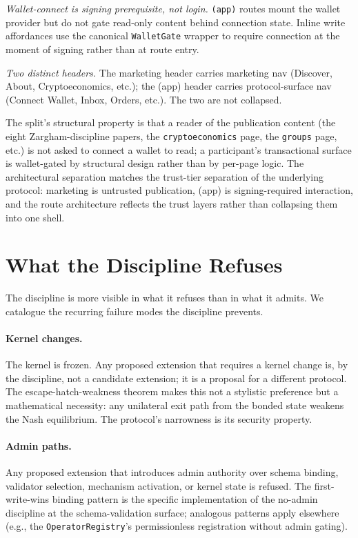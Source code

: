 \documentclass[11pt,a4paper]{article}
\theoremstyle{definition}
\theoremstyle{remark}
\begin{document}
\emph{Wallet-connect is signing prerequisite, not login.}
\texttt{(app)} routes mount the wallet provider but do not gate
read-only content behind connection state. Inline write affordances
use the canonical \texttt{WalletGate} wrapper to require connection
at the moment of signing rather than at route entry.

\emph{Two distinct headers.} The marketing header carries marketing
nav (Discover, About, Cryptoeconomics, etc.); the (app) header
carries protocol-surface nav (Connect Wallet, Inbox, Orders, etc.).
The two are not collapsed.

The split's structural property is that a reader of the
publication content (the eight Zargham-discipline papers, the
\texttt{cryptoeconomics} page, the \texttt{groups} page, etc.) is
not asked to connect a wallet to read; a participant's
transactional surface is wallet-gated by structural design rather
than by per-page logic. The architectural separation matches the
trust-tier separation of the underlying protocol: marketing is
untrusted publication, (app) is signing-required interaction, and
the route architecture reflects the trust layers rather than
collapsing them into one shell.

\section{What the Discipline Refuses}
\label{sec:refusals}

The discipline is more visible in what it refuses than in what it
admits. We catalogue the recurring failure modes the discipline
prevents.

\paragraph{Kernel changes.}
The kernel is frozen. Any proposed extension that requires a kernel
change is, by the discipline, not a candidate extension; it is a
proposal for a different protocol. The escape-hatch-weakness theorem
makes this not a stylistic preference but a mathematical necessity:
any unilateral exit path from the bonded state weakens the Nash
equilibrium. The protocol's
narrowness is its security property.

\paragraph{Admin paths.}
Any proposed extension that introduces admin authority over schema
binding, validator selection, mechanism activation, or kernel
state is refused. The first-write-wins binding pattern is the
specific implementation of the no-admin discipline at the
schema-validation surface; analogous patterns apply elsewhere
(e.g., the \texttt{OperatorRegistry}'s permissionless registration
without admin gating).
\end{document}

